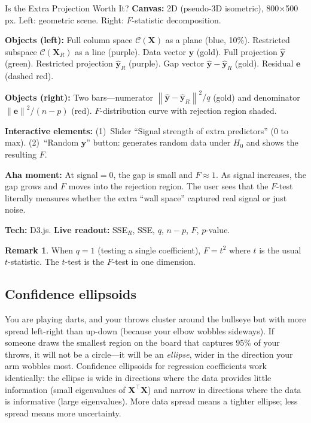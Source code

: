 \documentclass[11pt,a4paper]{article}
\theoremstyle{plain}
\theoremstyle{definition}
\newtheorem{remark}[theorem]{Remark}
\newcommand{\yhat}{\hat{\bm{y}}}
\newcommand{\bX}{\bm{X}}
\newcommand{\by}{\bm{y}}
\newcommand{\be}{\bm{e}}
\newcommand{\Col}{\mathcal{C}}
\newcommand{\norm}[1]{\left\lVert #1 \right\rVert}
\begin{document}
\begin{vizspec}{Is the Extra Projection Worth It?}
\textbf{Canvas:} 2D (pseudo-3D isometric), 800$\times$500\,px.
Left: geometric scene.  Right: $F$-statistic decomposition.

\textbf{Objects (left):} Full column space $\Col(\bX)$ as a plane
(\textcolor{colspace}{blue}, 10\%).  Restricted subspace $\Col(\bX_R)$
as a line (\textcolor{constraint}{purple}).  Data vector $\by$
(\textcolor{response}{gold}).  Full projection $\yhat$
(\textcolor{projection}{green}).  Restricted projection $\yhat_R$
(\textcolor{constraint}{purple}).  Gap vector $\yhat - \yhat_R$
(\textcolor{response}{gold}).  Residual $\be$ (dashed
\textcolor{residual}{red}).

\textbf{Objects (right):} Two bars---numerator
$\norm{\yhat-\yhat_R}^2/q$ (\textcolor{response}{gold}) and
denominator $\norm{\be}^2/(n-p)$ (\textcolor{residual}{red}).
$F$-distribution curve with rejection region shaded.

\textbf{Interactive elements:}
(1)~Slider ``Signal strength of extra predictors'' (0 to max).
(2)~``Random $\by$'' button: generates random data under $H_0$
and shows the resulting $F$.

\textbf{Aha moment:} At signal${}=0$, the gap is small and $F\approx 1$.
As signal increases, the gap grows and $F$ moves into the rejection
region.  The user sees that the $F$-test literally measures whether the
extra ``wall space'' captured real signal or just noise.

\textbf{Tech:} D3.js.
\quad \textbf{Live readout:} SSE$_R$, SSE, $q$, $n-p$, $F$, $p$-value.
\end{vizspec}

\begin{remark}
When $q=1$ (testing a single coefficient), $F = t^2$ where $t$ is the
usual $t$-statistic.
The $t$-test is the $F$-test in one dimension.
\end{remark}

\subsection{Confidence ellipsoids}

\begin{toystory}
You are playing darts, and your throws cluster around the bullseye but
with more spread left-right than up-down (because your elbow wobbles
sideways).  If someone draws the smallest region on the board that
captures 95\% of your throws, it will not be a circle---it will be an
\emph{ellipse}, wider in the direction your arm wobbles most.  Confidence
ellipsoids for regression coefficients work identically: the ellipse is
wide in directions where the data provides little information (small
eigenvalues of $\bX^\top\bX$) and narrow in directions where the data
is informative (large eigenvalues).  More data spread means a tighter
ellipse; less spread means more uncertainty.
\end{toystory}
\end{document}
